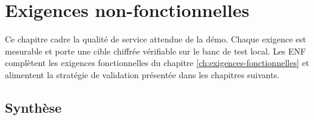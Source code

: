 \chapter{Exigences non-fonctionnelles}
\label{ch:exigences-non-fonctionnelles}

Ce chapitre cadre la qualité de service attendue de la démo. Chaque exigence est mesurable et porte une cible chiffrée vérifiable sur le banc de test local. Les ENF complètent les exigences fonctionnelles du chapitre \ref{ch:exigences-fonctionnelles} et alimentent la stratégie de validation présentée dans les chapitres suivants.

\section*{Synthèse}
\label{sec:enf-synthese}

